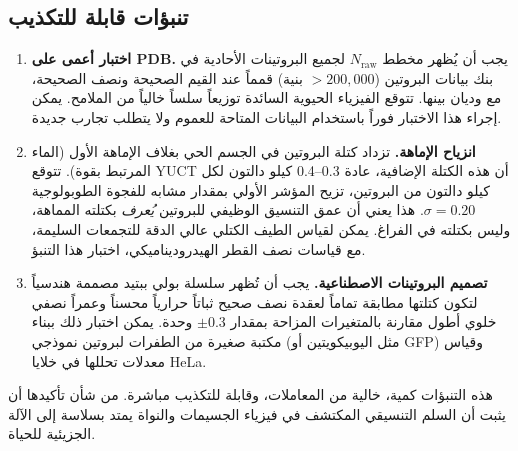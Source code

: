 \documentclass[11pt,a4paper]{article}
\begin{document}
	\subsection{تنبؤات قابلة للتكذيب}
	\begin{enumerate}
		\item \textbf{اختبار أعمى على PDB.} يجب أن يُظهر مخطط \(N_{\mathrm{raw}}\) لجميع البروتينات الأحادية في بنك بيانات البروتين (\(>200,000\) بنية) قمماً عند القيم الصحيحة ونصف الصحيحة، مع وديان بينها. تتوقع الفيزياء الحيوية السائدة توزيعاً سلساً خالياً من الملامح. يمكن إجراء هذا الاختبار فوراً باستخدام البيانات المتاحة للعموم ولا يتطلب تجارب جديدة.
		\item \textbf{انزياح الإماهة.} تزداد كتلة البروتين في الجسم الحي بغلاف الإماهة الأول (الماء المرتبط بقوة). تتوقع YUCT أن هذه الكتلة الإضافية، عادة 0.3–0.4 كيلو دالتون لكل كيلو دالتون من البروتين، تزيح المؤشر الأولي بمقدار مشابه للفجوة الطوبولوجية \(\sigma = 0.20\). هذا يعني أن عمق التنسيق الوظيفي للبروتين \emph{يُعرف} بكتلته المماهة، وليس بكتلته في الفراغ. يمكن لقياس الطيف الكتلي عالي الدقة للتجمعات السليمة، مع قياسات نصف القطر الهيدروديناميكي، اختبار هذا التنبؤ.
		\item \textbf{تصميم البروتينات الاصطناعية.} يجب أن تُظهر سلسلة بولي ببتيد مصممة هندسياً لتكون كتلتها مطابقة تماماً لعقدة نصف صحيح ثباتاً حرارياً محسناً وعمراً نصفي خلوي أطول مقارنة بالمتغيرات المزاحة بمقدار \(\pm 0.3\) وحدة. يمكن اختبار ذلك ببناء مكتبة صغيرة من الطفرات لبروتين نموذجي (مثل اليوبيكويتين أو GFP) وقياس معدلات تحللها في خلايا HeLa.
	\end{enumerate}
	
	هذه التنبؤات كمية، خالية من المعاملات، وقابلة للتكذيب مباشرة. من شأن تأكيدها أن يثبت أن السلم التنسيقي المكتشف في فيزياء الجسيمات والنواة يمتد بسلاسة إلى الآلة الجزيئية للحياة.
	
\end{document}
